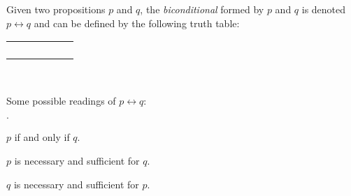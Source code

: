 \begin{definition}
    \begin{center}
        \begin{minipage}[t]{.55\linewidth}
            Given two propositions \(p\) and \(q\), the \emph{biconditional} formed by \(p\) and \(q\)
            is denoted \(p \leftrightarrow q\) and can be defined by the following truth table:
            \begin{table}[H]
                \centering
                \label{tab:iff}
                \begin{tabular}{|CcCc||Cc|} \hline
                     &  &  \\ \hline
                    \thead{\(\top\)} & \thead{\(\top\)} &  \\
                    \thead{\(\top\)} & \thead{\(\bot\)} &  \\
                    \thead{\(\bot\)} & \thead{\(\top\)} &  \\
                    \thead{\(\bot\)} & \thead{\(\bot\)} &  \\ \hline
                \end{tabular}
            \end{table}
        \end{minipage}%
        \begin{minipage}[t]{.05\linewidth}
            ~
        \end{minipage}%
        \begin{minipage}[t]{.4\linewidth}
            Some possible readings of \(p \leftrightarrow q\):\\
            \begin{list}{\(\cdot\)}
                \item
                    \(p\) if and only if \(q\).
                \item
                    \(p\) is necessary and sufficient for \(q\).
                \item
                    \(q\) is necessary and sufficient for \(p\).
            \end{list}
        \end{minipage}
    \end{center}
\end{definition}

